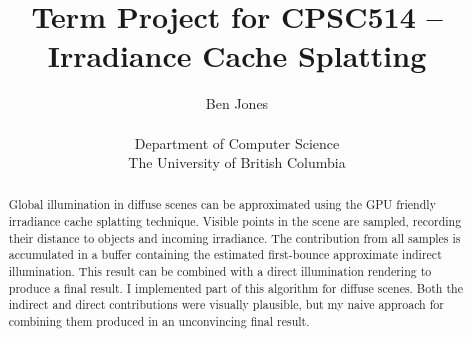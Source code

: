 \documentclass[10pt,twopage]{acmsiggraph}
\begin{document}
%
%

\title{Term Project for CPSC514 -- Irradiance Cache Splatting}

\newcommand\name{Ben Jones}

\author{\name\\
\\
Department of Computer Science\\
The University of British Columbia}

\maketitle

%
%

\begin{abstract}
  Global illumination in diffuse scenes can be approximated using the GPU friendly irradiance cache splatting technique\cite{mainpaper}.  Visible points in the scene are sampled, recording their distance to objects and incoming irradiance.  The contribution from all samples is accumulated in a buffer containing the estimated first-bounce approximate indirect illumination.  This result can be combined with a direct illumination rendering to produce a final result.   I implemented part of this algorithm for diffuse scenes.  Both the indirect and direct contributions were visually plausible, but my naive approach for combining them produced in an unconvincing final result.  
  \end{abstract}

%
%
\end{document}
